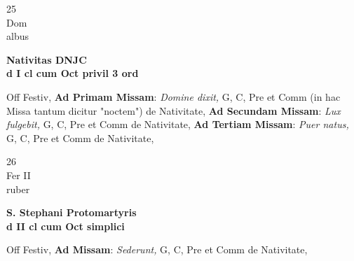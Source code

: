 \documentclass[10pt, openany]{book}
\begin{document}
        \begin{center}
            \begin{minipage}{3.5in}
                \vspace{2em}
                \begin{minipage}{0.5in}
                    {\Huge 25} \\
                    {\normalsize Dom} \\
                    {\normalsize albus}
                \end{minipage}
                \begin{minipage}{3.0in}
                    \textbf{ \large Nativitas DNJC \\
                    \textnormal{\normalsize d I cl cum Oct privil 3 ord}} \\ 
                \end{minipage}
                \begin{justify}Off Festiv, \textbf{Ad Primam Missam}: \textit{Domine dixit,} G, C, Pre et Comm (in hac Missa tantum dicitur "noctem") de Nativitate,  \textbf{Ad Secundam Missam}: \textit{Lux fulgebit,} G, C, Pre et Comm de Nativitate,  \textbf{Ad Tertiam Missam}: \textit{Puer natus,} G, C, Pre et Comm de Nativitate,  
                \end{justify}
            \end{minipage}
        \end{center}
    
        \begin{center}
            \begin{minipage}{3.5in}
                \vspace{2em}
                \begin{minipage}{0.5in}
                    {\Huge 26} \\
                    {\normalsize Fer II} \\
                    {\normalsize ruber}
                \end{minipage}
                \begin{minipage}{3.0in}
                    \textbf{ \large S. Stephani Protomartyris \\
                    \textnormal{\normalsize d II cl cum Oct simplici}} \\ 
                \end{minipage}
                \begin{justify}Off Festiv, \textbf{Ad Missam}: \textit{Sederunt,} G, C, Pre et Comm de Nativitate,  
                \end{justify}
            \end{minipage}
        \end{center}
    
\end{document}
